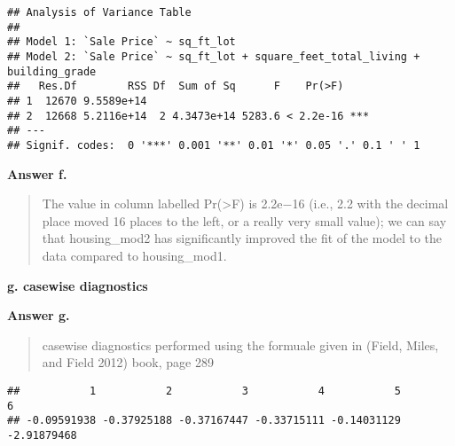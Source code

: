 \documentclass[
]{article}
\newenvironment{Shaded}{\begin{snugshade}}{\end{snugshade}}
\newcommand{\KeywordTok}[1]{\textcolor[rgb]{0.13,0.29,0.53}{\textbf{#1}}}
\newcommand{\NormalTok}[1]{#1}
\newcommand{\OperatorTok}[1]{\textcolor[rgb]{0.81,0.36,0.00}{\textbf{#1}}}
\newcommand{\StringTok}[1]{\textcolor[rgb]{0.31,0.60,0.02}{#1}}
\begin{document}
\begin{verbatim}
## Analysis of Variance Table
## 
## Model 1: `Sale Price` ~ sq_ft_lot
## Model 2: `Sale Price` ~ sq_ft_lot + square_feet_total_living + building_grade
##   Res.Df        RSS Df  Sum of Sq      F    Pr(>F)    
## 1  12670 9.5589e+14                                   
## 2  12668 5.2116e+14  2 4.3473e+14 5283.6 < 2.2e-16 ***
## ---
## Signif. codes:  0 '***' 0.001 '**' 0.01 '*' 0.05 '.' 0.1 ' ' 1
\end{verbatim}

\textbf{Answer f.}

\begin{quote}
The value in column labelled Pr(\textgreater F) is 2.2e−16 (i.e., 2.2
with the decimal place moved 16 places to the left, or a really very
small value); we can say that housing\_mod2 has significantly improved
the fit of the model to the data compared to housing\_mod1.
\end{quote}

\textbf{g. casewise diagnostics }

\textbf{Answer g.}

\begin{quote}
casewise diagnostics performed using the formuale given in (Field,
Miles, and Field 2012) book, page 289
\end{quote}

\begin{Shaded}
\end{Shaded}

\begin{verbatim}
##           1           2           3           4           5           6 
## -0.09591938 -0.37925188 -0.37167447 -0.33715111 -0.14031129 -2.91879468
\end{verbatim}

\begin{Shaded}
\end{Shaded}
\end{document}
